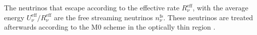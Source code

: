 The neutrinos that escape according to the effective rate $R_{\nu}^{\text{eff}}$,
with the average energy $U_{\nu}^{\text{eff}}/R_{\nu}^{\text{eff}}$ 
are the free streaming neutrinos $n_{\nu}^{\text{fs}}$. 
%
These neutrinos are treated afterwards according to the 
M0 scheme in the optically thin region \citep{Radice:2016dwd}.

%


